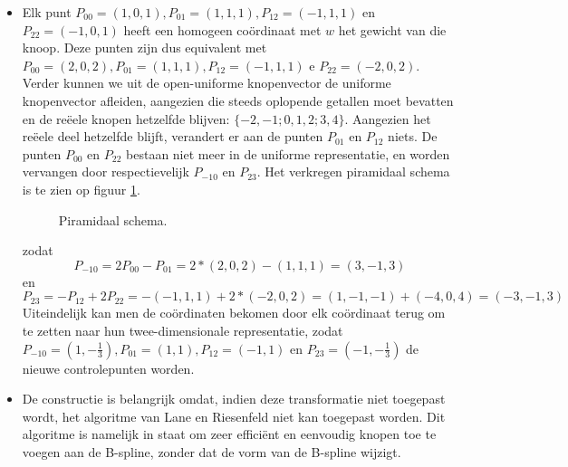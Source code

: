 \documentclass{report}
\begin{document}
\begin{enumerate}
{\begin{itemize}
		\end{itemize}
	}
		
	{
		\begin{itemize} 	
			\item Elk punt $P_{00} = (1, 0, 1), P_{01} = (1, 1, 1), P_{12} = (-1, 1, 1)$ en $P_{22} = (-1, 0, 1)$ heeft een homogeen coördinaat met $w$ het gewicht van die knoop. Deze punten zijn dus equivalent met $P_{00} = (2, 0, 2), P_{01} = (1, 1, 1), P_{12} = (-1, 1, 1)$ e $P_{22} = (-2, 0 , 2)$. Verder kunnen we uit de open-uniforme knopenvector de uniforme knopenvector afleiden, aangezien die steeds oplopende getallen moet bevatten en de reëele knopen hetzelfde blijven: $\{-2, -1; 0, 1, 2; 3, 4\}$. Aangezien het reëele deel hetzelfde blijft, verandert er aan de punten $P_{01}$ en $P_{12}$ niets. De punten $P_{00}$ en $P_{22}$ bestaan niet meer in de uniforme representatie, en worden vervangen door respectievelijk $P_{-10}$ en $P_{23}$. Het verkregen piramidaal schema is te zien op figuur \ref{fig:open_uniform_naar_uniform}.
			\begin{figure}[ht]
				\centering
				\caption{Piramidaal schema.}
				\label{fig:open_uniform_naar_uniform}
			\end{figure}

			zodat $$P_{-10} = 2P_{00} - P_{01} = 2 * (2, 0, 2) - (1, 1, 1) = (3, -1, 3)$$ en $$P_{23} = -P_{12} + 2P_{22} = -(-1, 1, 1) + 2 * (-2, 0, 2) = (1, -1, -1) + (-4, 0, 4) = (-3, -1, 3)$$ Uiteindelijk kan men de coördinaten bekomen door elk coördinaat terug om te zetten naar hun twee-dimensionale representatie, zodat $P_{-10} = (1, -\frac{1}{3}), P_{01} = (1, 1), P_{12} = (-1, 1)$ en $P_{23} = (-1, -\frac{1}{3})$ de nieuwe controlepunten worden.

			\item De constructie is belangrijk omdat, indien deze transformatie niet toegepast wordt, het algoritme van Lane en Riesenfeld niet kan toegepast worden. Dit algoritme is namelijk in staat om zeer efficiënt en eenvoudig knopen toe te voegen aan de B-spline, zonder dat de vorm van de B-spline wijzigt. 
		\end{itemize}
	}
\end{enumerate}
\end{document}
